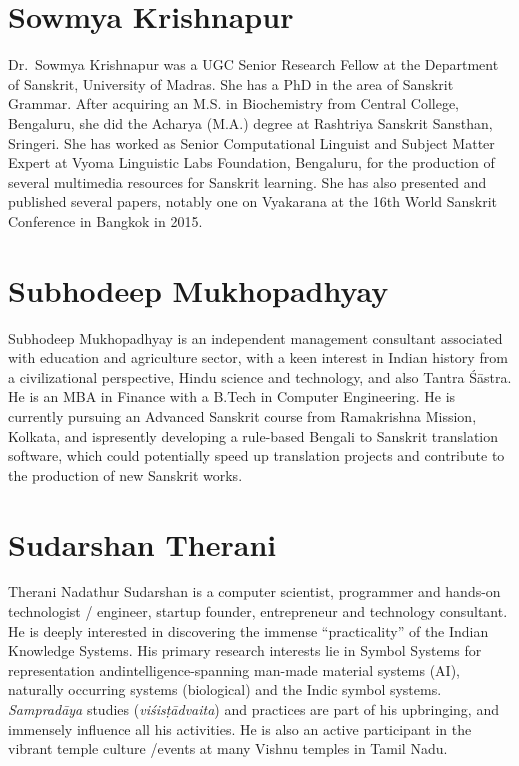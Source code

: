 \section*{Sowmya Krishnapur}

Dr.~Sowmya Krishnapur was a UGC Senior Research Fellow at the Department of Sanskrit, University of Madras. She has a PhD in the area of Sanskrit Grammar. After acquiring an M.S. in Biochemistry from Central College, Bengaluru, she did the Acharya (M.A.) degree at Rashtriya Sanskrit Sansthan, Sringeri. She has worked as Senior Computational Linguist and Subject Matter Expert at Vyoma Linguistic Labs Foundation, Bengaluru, for the production of several multimedia resources for Sanskrit learning. She has also presented and published several papers, notably one on Vyakarana at the 16th World Sanskrit Conference in Bangkok in 2015.

\section*{Subhodeep Mukhopadhyay}

Subhodeep Mukhopadhyay is an independent management consultant associated with education and agriculture sector, with a keen interest in Indian history from a civilizational perspective, Hindu science and technology, and also Tantra Śāstra. He is an MBA in Finance with a B.Tech in Computer Engineering. He is currently pursuing an Advanced Sanskrit course from Ramakrishna Mission, Kolkata, and is\break presently developing a rule-based Bengali to Sanskrit translation software, which could potentially speed up translation projects and contribute to the production of new Sanskrit works.


\section*{Sudarshan Therani}

Therani Nadathur Sudarshan is a computer scientist, programmer and hands-on technologist / engineer, startup founder, entrepreneur and technology consultant. He is deeply interested in discovering the immense “practicality” of the Indian Knowledge Systems. His primary research interests lie in Symbol Systems for representation and\break intelligence-spanning man-made material systems (AI), naturally occurring systems (biological) and the Indic symbol systems. {\sl Sampradāya} studies ({\sl viśisṭādvaita}) and practices are part of his upbringing, and immensely influence all his activities. He is also an active participant in the vibrant temple culture /events at many Vishnu temples in Tamil Nadu.

